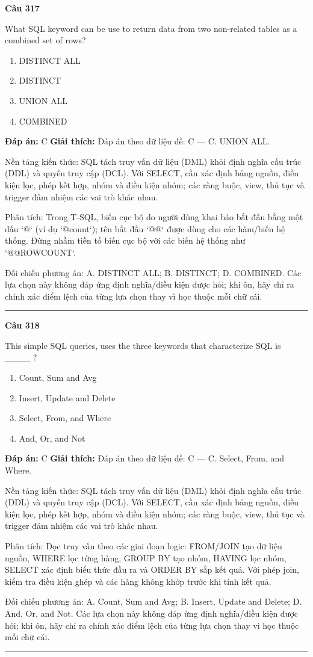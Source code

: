 \documentclass[11pt,a4paper]{article}
\newenvironment{question}[1]{%
  \par\vspace{1em}\noindent\textbf{\large Câu #1}\par\vspace{0.4em}
}{%
  \par\vspace{1em}\hrule\vspace{0.6em}
}
\newenvironment{choices}{%
  \begin{enumerate}[label=\textbf{\Alph*.},leftmargin=2.2em,itemsep=2pt,topsep=3pt]
}{%
  \end{enumerate}
}
\newcommand{\choice}{\item}
\begin{document}
\begin{question}{317}
What SQL keyword can be use to return data from two non-related tables as a combined set of rows?
\begin{choices}
\choice DISTINCT ALL
\choice DISTINCT
\choice UNION ALL
\choice COMBINED
\end{choices}
\textbf{Đáp án:} C
\textbf{Giải thích:} Đáp án theo dữ liệu đề: C — C. UNION ALL.

Nền tảng kiến thức: SQL tách truy vấn dữ liệu (DML) khỏi định nghĩa cấu trúc (DDL) và quyền truy cập (DCL). Với SELECT, cần xác định bảng nguồn, điều kiện lọc, phép kết hợp, nhóm và điều kiện nhóm; các ràng buộc, view, thủ tục và trigger đảm nhiệm các vai trò khác nhau.

Phân tích: Trong T-SQL, biến cục bộ do người dùng khai báo bắt đầu bằng một dấu `@` (ví dụ `@count`); tên bắt đầu `@@` được dùng cho các hàm/biến hệ thống. Đừng nhầm tiền tố biến cục bộ với các biến hệ thống như `@@ROWCOUNT`.

Đối chiếu phương án: A. DISTINCT ALL; B. DISTINCT; D. COMBINED. Các lựa chọn này không đáp ứng định nghĩa/điều kiện được hỏi; khi ôn, hãy chỉ ra chính xác điểm lệch của từng lựa chọn thay vì học thuộc mỗi chữ cái.
\end{question}

\begin{question}{318}
This simple SQL queries, uses the three keywords that characterize SQL is ____ ?
\begin{choices}
\choice Count, Sum and Avg
\choice Insert, Update and Delete
\choice Select, From, and Where
\choice And, Or, and Not
\end{choices}
\textbf{Đáp án:} C
\textbf{Giải thích:} Đáp án theo dữ liệu đề: C — C. Select, From, and Where.

Nền tảng kiến thức: SQL tách truy vấn dữ liệu (DML) khỏi định nghĩa cấu trúc (DDL) và quyền truy cập (DCL). Với SELECT, cần xác định bảng nguồn, điều kiện lọc, phép kết hợp, nhóm và điều kiện nhóm; các ràng buộc, view, thủ tục và trigger đảm nhiệm các vai trò khác nhau.

Phân tích: Đọc truy vấn theo các giai đoạn logic: FROM/JOIN tạo dữ liệu nguồn, WHERE lọc từng hàng, GROUP BY tạo nhóm, HAVING lọc nhóm, SELECT xác định biểu thức đầu ra và ORDER BY sắp kết quả. Với phép join, kiểm tra điều kiện ghép và các hàng không khớp trước khi tính kết quả.

Đối chiếu phương án: A. Count, Sum and Avg; B. Insert, Update and Delete; D. And, Or, and Not. Các lựa chọn này không đáp ứng định nghĩa/điều kiện được hỏi; khi ôn, hãy chỉ ra chính xác điểm lệch của từng lựa chọn thay vì học thuộc mỗi chữ cái.
\end{question}
\end{document}
